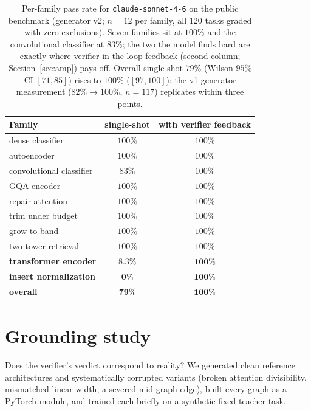 \documentclass{article}
\begin{document}
\begin{table}[t]
\centering
\small
\begin{tabular}{lcc}
\toprule
Family & single-shot & with verifier feedback \\
\midrule
dense classifier & $100\%$ & $100\%$ \\
autoencoder & $100\%$ & $100\%$ \\
convolutional classifier & $83\%$ & $100\%$ \\
GQA encoder & $100\%$ & $100\%$ \\
repair attention & $100\%$ & $100\%$ \\
trim under budget & $100\%$ & $100\%$ \\
grow to band & $100\%$ & $100\%$ \\
two-tower retrieval & $100\%$ & $100\%$ \\
\textbf{transformer encoder} & $\mathbf{8.3\%}$ & $\mathbf{100\%}$ \\
\textbf{insert normalization} & $\mathbf{0\%}$ & $\mathbf{100\%}$ \\
\midrule
\textbf{overall} & $\mathbf{79\%}$ & $\mathbf{100\%}$ \\
\bottomrule
\end{tabular}
\caption{Per-family pass rate for \texttt{claude-sonnet-4-6} on the public benchmark (generator v2; $n{=}12$ per family, all $120$ tasks graded with zero exclusions). Seven families sit at $100\%$ and the convolutional classifier at $83\%$; the two the model finds hard are exactly where verifier-in-the-loop feedback (second column; Section~\ref{sec:amp}) pays off. Overall single-shot $79\%$ (Wilson $95\%$ CI $[71,85]$) rises to $100\%$ ($[97,100]$); the v1-generator measurement ($82\%\to100\%$, $n{=}117$) replicates within three points.}
\label{tab:perfamily}
\end{table}

\section{Grounding study}
\label{sec:ground}
Does the verifier's verdict correspond to reality? We generated clean reference architectures and systematically corrupted variants (broken attention divisibility, mismatched linear width, a severed mid-graph edge), built every graph as a PyTorch module, and trained each briefly on a synthetic fixed-teacher task.
\end{document}
